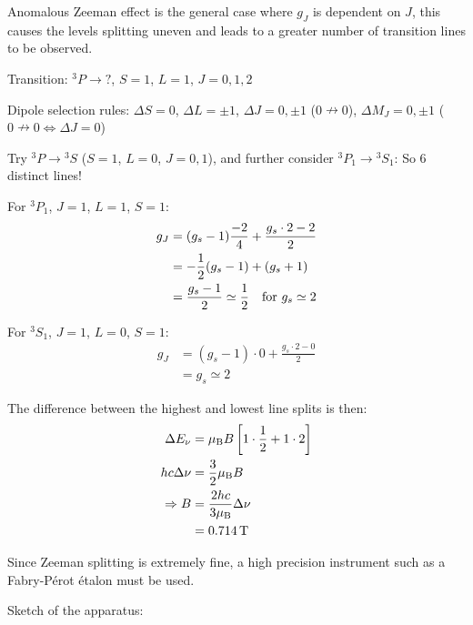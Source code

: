 \begin{parts}
	Anomalous Zeeman effect is the general case where $g_J$ is dependent on $J$, this causes the levels splitting uneven and leads to a greater number of transition lines to be observed.
	
	Transition: ${}^3 P \to ?$, $S=1$, $L=1$, $J=0, 1, 2$
	
	Dipole selection rules: $\Delta S=0$, $\Delta L=\pm 1$, $\Delta J=0,\pm 1$ ($0 \nrightarrow 0$), $\Delta M_J = 0,\pm 1$ ($0 \nrightarrow 0 \iff \Delta J=0$)
	
	Try ${}^3 P \to {}^3 S$ ($S=1$, $L=0$, $J=0, 1$), and further consider ${}^3 P_1 \to {}^3 S_1$:
	So 6 distinct lines!
	
	For ${}^3 P_1$, $J=1$, $L=1$, $S=1$:
	\begin{align*}
		g_J &= (g_s - 1) \frac{-2}{4} + \frac{g_s \cdot 2 - 2}{2} \\
		&= -\frac{1}{2}(g_s - 1) + (g_s + 1) \\
		&= \frac{g_s - 1}{2} \simeq \frac{1}{2} \textnormal{\hspace{1em}for } g_s \simeq 2
	\end{align*}
	
	For ${}^3 S_1$, $J=1$, $L=0$, $S=1$:
	\begin{align*}
		g_J &= (g_s - 1) \cdot 0 + \frac{g_s \cdot 2 - 0}{2} \\
		&= g_s \simeq 2
	\end{align*}
	
	The difference between the highest and lowest line splits is then:
	\begin{align*}
		\Delta E_\nu &= \mu_\mathrm{B} B \left[1\cdot\frac{1}{2} + 1 \cdot 2\right] \\
		hc\Delta\nu &= \frac{3}{2}\mu_\mathrm{B} B \\
		\Rightarrow B &= \frac{2hc}{3\mu_\mathrm{B}} \Delta\nu \\
		&= \SI{0.714}{\tesla}
	\end{align*}
	
	Since Zeeman splitting is extremely fine, a high precision instrument such as a Fabry-Pérot étalon must be used.
	
	\newpage
	Sketch of the apparatus:
\end{parts}